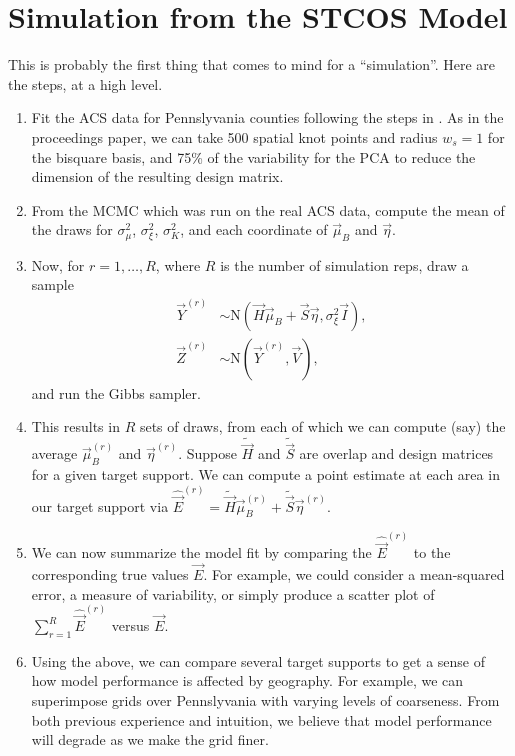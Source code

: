 \documentclass[12pt]{article}
\begin{document}
\section{Simulation from the STCOS Model}
This is probably the first thing that comes to mind for a ``simulation''. Here are the steps, at a high level.
%
\begin{enumerate}
\item Fit the ACS data for Pennslyvania counties following the steps in \citet{JSM2017-STCOS}. As in the proceedings paper, we can take 500 spatial knot points and radius $w_s = 1$ for the bisquare basis, and 75\% of the variability for the PCA to reduce the dimension of the resulting design matrix.

\item From the MCMC which was run on the real ACS data, compute the mean of the draws for $\sigma_\mu^2$, $\sigma_\xi^2$, $\sigma_K^2$, and each coordinate of $\vec{\mu}_B$ and $\vec{\eta}$.

\item Now, for $r = 1, \ldots, R$, where $R$ is the number of simulation reps, draw a sample
%
\begin{align*}
\vec{Y}^{(r)} &\sim \text{N}(\vec{H} \vec{\mu}_B + \vec{S} \vec{\eta}, \sigma_\xi^2 \vec{I}), \\
\vec{Z}^{(r)} &\sim \text{N}(\vec{Y}^{(r)}, \vec{V}),
\end{align*}
%
and run the Gibbs sampler.

\item This results in $R$ sets of draws, from each of which we can compute (say) the average $\vec{\mu}_B^{(r)}$ and $\vec{\eta}^{(r)}$. Suppose $\tilde{\vec{H}}$ and $\tilde{\vec{S}}$ are overlap and design matrices for a given target support. We can compute a point estimate at each area in our target support via $\hat{\vec{E}}^{(r)} = \tilde{\vec{H}} \vec{\mu}_B^{(r)} + \tilde{\vec{S}} \vec{\eta}^{(r)}$.

\item We can now summarize the model fit by comparing the $\hat{\vec{E}}^{(r)}$ to the corresponding true values $\vec{E}$. For example, we could consider a mean-squared error, a measure of variability, or simply produce a scatter plot of $\sum_{r=1}^R \hat{\vec{E}}^{(r)}$ versus $\vec{E}$.

\item Using the above, we can compare several target supports to get a sense of how model performance is affected by geography. For example, we can superimpose grids over Pennslyvania with varying levels of coarseness. From both previous experience and intuition, we believe that model performance will degrade as we make the grid finer.
\end{enumerate}
\end{document}

